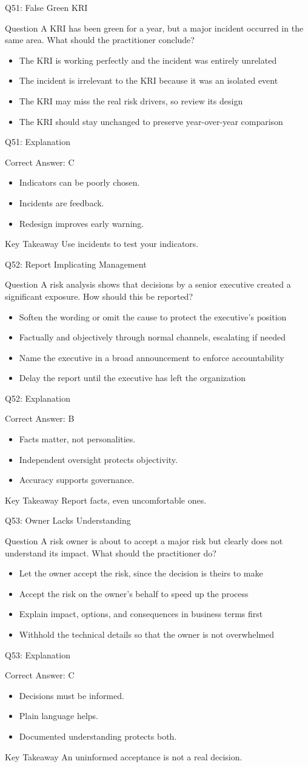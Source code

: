 \documentclass[aspectratio=169]{beamer}
\newcommand{\hq}[7]{%
	\begin{frame}{Q#1: #2}
		\begin{block}{Question}
			#3
		\end{block}
		\begin{itemize}
			#4
		\end{itemize}
	\end{frame}
	\begin{frame}{Q#1: Explanation}
		\begin{block}{Correct Answer: #5}
			\begin{itemize}
				#6
			\end{itemize}
		\end{block}
		\begin{alertblock}{Key Takeaway}
			#7
		\end{alertblock}
	\end{frame}
}
\begin{document}
	\hq{51}{False Green KRI}
	{A KRI has been green for a year, but a major incident occurred in the same area. What should the practitioner conclude?}
	{\item[\textbf{(A)}] The KRI is working perfectly and the incident was entirely unrelated
		\item[\textbf{(B)}] The incident is irrelevant to the KRI because it was an isolated event
		\item[\textbf{(C)}] The KRI may miss the real risk drivers, so review its design
		\item[\textbf{(D)}] The KRI should stay unchanged to preserve year-over-year comparison}
	{C}
	{\item Indicators can be poorly chosen.
		\item Incidents are feedback.
		\item Redesign improves early warning.}
	{Use incidents to test your indicators.}

	\hq{52}{Report Implicating Management}
	{A risk analysis shows that decisions by a senior executive created a significant exposure. How should this be reported?}
	{\item[\textbf{(A)}] Soften the wording or omit the cause to protect the executive's position
		\item[\textbf{(B)}] Factually and objectively through normal channels, escalating if needed
		\item[\textbf{(C)}] Name the executive in a broad announcement to enforce accountability
		\item[\textbf{(D)}] Delay the report until the executive has left the organization}
	{B}
	{\item Facts matter, not personalities.
		\item Independent oversight protects objectivity.
		\item Accuracy supports governance.}
	{Report facts, even uncomfortable ones.}

	\hq{53}{Owner Lacks Understanding}
	{A risk owner is about to accept a major risk but clearly does not understand its impact. What should the practitioner do?}
	{\item[\textbf{(A)}] Let the owner accept the risk, since the decision is theirs to make
		\item[\textbf{(B)}] Accept the risk on the owner's behalf to speed up the process
		\item[\textbf{(C)}] Explain impact, options, and consequences in business terms first
		\item[\textbf{(D)}] Withhold the technical details so that the owner is not overwhelmed}
	{C}
	{\item Decisions must be informed.
		\item Plain language helps.
		\item Documented understanding protects both.}
	{An uninformed acceptance is not a real decision.}
\end{document}
